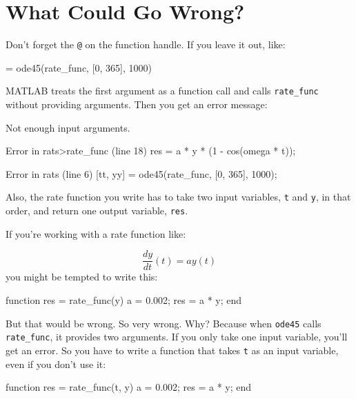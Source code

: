 \documentclass[../../book.tex]{subfiles}
\begin{document}
\section{What Could Go Wrong?}

Don't forget the \lstinline{@} on the function handle.
If you leave it out, like:

\begin{code}
[tt, yy] = ode45(rate_func, [0, 365], 1000)
\end{code}
MATLAB treats the first argument as a function
call and calls \lstinline{rate_func} without providing arguments.
Then you get an error message:


\begin{code}
Not enough input arguments.

Error in rats>rate_func (line 18)
    res = a * y * (1 - cos(omega * t));

Error in rats (line 6)
    [tt, yy] = ode45(rate_func, [0, 365], 1000);
\end{code}

Also, the rate function you write has to take two input variables,
\lstinline{t} and \lstinline{y}, in that order, and return one output variable,
\lstinline{res}.


If you're working with a rate function like:

\begin{equation*}
\frac{dy}{dt}(t) = a y(t)
\end{equation*}
you might be tempted to write this:

\begin{code}
function res = rate_func(y)        %
    a = 0.002;
    res = a * y;
end
\end{code}

But that would be wrong.  So very wrong.  Why?  Because
when \lstinline{ode45} calls \lstinline{rate_func}, it provides two arguments.
If you only take one input variable, you'll get an error.  So
you have to write a function that takes \lstinline{t} as an input
variable, even if you don't use it:


\begin{code}
function res = rate_func(t, y)     %
    a = 0.002;
    res = a * y;
end
\end{code}
\end{document}

